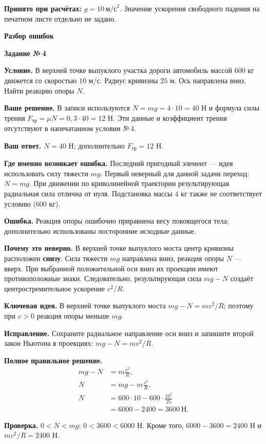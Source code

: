 \documentclass[a4paper,11pt]{article}
\newcommand{\keyidea}{\textcolor{accent}{\textbf{Ключевая идея.}}}
\newcommand{\mistake}{\textcolor{error}{\textbf{Ошибка.}}}
\newcommand{\taskhead}[1]{\phantomsection\label{task:#1}\begin{center}{\Large\bfseries\color{ink}Задание №\,#1}\end{center}\vspace{3pt}}
\newcommand{\field}[1]{\par\vspace{2pt}\textbf{#1}\quad}
\begin{document}
\textbf{Принято при расчётах:} $g=10\,\text{м/с}^2$. Значение ускорения свободного падения на печатном листе отдельно не задано.
\clearpage
\thispagestyle{empty}
\vspace*{0.36\textheight}
\begin{center}{\Huge\bfseries\color{accent}Разбор ошибок}\end{center}
\clearpage

\taskhead{4}
\field{Условие.} В верхней точке выпуклого участка дороги автомобиль массой $600$ кг движется со скоростью $10$ м/с. Радиус кривизны $25$ м. Ось направлена вниз. Найти реакцию опоры $N$.

\field{Ваше решение.} В записи используются $N=mg=4\cdot10=40$ Н и формула силы трения $F_{\text{тр}}=\mu N=0{,}3\cdot40=12$ Н. Эти данные и коэффициент трения отсутствуют в напечатанном условии №\,4.

\field{Ваш ответ.} $N=40$ Н; дополнительно $F_{\text{тр}}=12$ Н.

\field{Где именно возникает ошибка.} Последний пригодный элемент --- идея использовать силу тяжести $mg$. Первый неверный для данной задачи переход: $N=mg$. При движении по криволинейной траектории результирующая радиальная сила отлична от нуля. Подстановка массы $4$ кг также не соответствует условию ($600$ кг).

\mistake{} Реакция опоры ошибочно приравнена весу покоящегося тела; дополнительно использованы посторонние исходные данные.

\field{Почему это неверно.} В верхней точке выпуклого моста центр кривизны расположен \textbf{снизу}. Сила тяжести $mg$ направлена вниз, реакция опоры $N$ --- вверх. При выбранной положительной оси вниз их проекции имеют противоположные знаки. Следовательно, результирующая сила $mg-N$ создаёт центростремительное ускорение $v^2/R$.

\keyidea{} В верхней точке выпуклого моста $mg-N=mv^2/R$; поэтому при $v>0$ реакция опоры меньше $mg$.

\field{Исправление.} Сохраните радиальное направление оси вниз и запишите второй закон Ньютона в проекциях: $mg-N=mv^2/R$.

\field{Полное правильное решение.}
\begin{align*}
mg-N&=m\frac{v^2}{R},\\
N&=mg-m\frac{v^2}{R},\\
N&=600\cdot10-600\cdot\frac{10^2}{25}\\
 &=6000-2400=\boxed{3600\ \text{Н}}.
\end{align*}
\field{Проверка.} $0<N<mg$: $0<3600<6000$ Н. Кроме того, $6000-3600=2400$ Н и $mv^2/R=2400$ Н.
\end{document}
